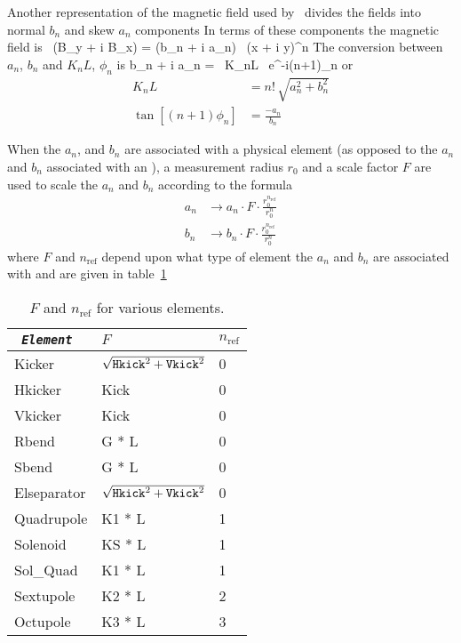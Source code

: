 Another representation of the magnetic field used by \bmad\ divides
the fields into normal $b_n$ and skew $a_n$ components In terms of
these components the magnetic field is
\Begineq
   \, (B_y + i B_x) = (b_n + i a_n) \, (x + i y)^n
\Endeq
The conversion between $a_n$, $b_n$ and $K_nL$, $\phi_n$ is
\Begineq
  b_n + i a_n =  \, K_nL \, e^{-i(n+1)\phi_n}
\Endeq
or
\begin{align}
  K_n L &= n! \, \sqrt{a_n^2 + b_n^2} \\
  \tan[(n+1) \phi_n] &= \frac{-a_n}{b_n}
\end{align}

When the $a_n$, and $b_n$ are associated with a physical element (as
opposed to the $a_n$ and $b_n$ associated with an ),
a measurement radius $r_0$ and a scale factor
$F$ are used to scale the $a_n$ and $b_n$ according to the formula
\begin{align}
  a_n &\rightarrow 
        a_n \cdot F \cdot \frac{r_0^{n_\text{ref}}}{r_0^n} \nonumber \\
  b_n &\rightarrow 
        b_n \cdot F \cdot \frac{r_0^{n_\text{ref}}}{r_0^n}
\end{align}
where $F$ and $n_\text{ref}$ depend upon what type of element the $a_n$ and
$b_n$ are associated with and are given in table~\ref{t:ab}

\begin{table}[h]
\centering
\begin{tabular}{|l|l|l|} \hline
\tt
  {\em Element} & $F$                              & $n_\text{ref}$ \\ \hline
  Kicker        & $\sqrt{{\tt Hkick}^2 + {\tt Vkick}^2}$ & 0 \\
  Hkicker       & Kick                                   & 0 \\
  Vkicker       & Kick                                   & 0 \\
  Rbend         & G * L                                  & 0 \\
  Sbend         & G * L                                  & 0 \\
  Elseparator   & $\sqrt{{\tt Hkick}^2 + {\tt Vkick}^2}$ & 0 \\
  Quadrupole    & K1 * L                                 & 1 \\
  Solenoid      & KS * L                                 & 1 \\
  Sol\_Quad     & K1 * L                                 & 1 \\
  Sextupole     & K2 * L                                 & 2 \\
  Octupole      & K3 * L                                 & 3 \\ \hline
\end{tabular}
\caption{$F$ and $n_\text{ref}$ for various elements.}
\label{t:ab}
\end{table}

